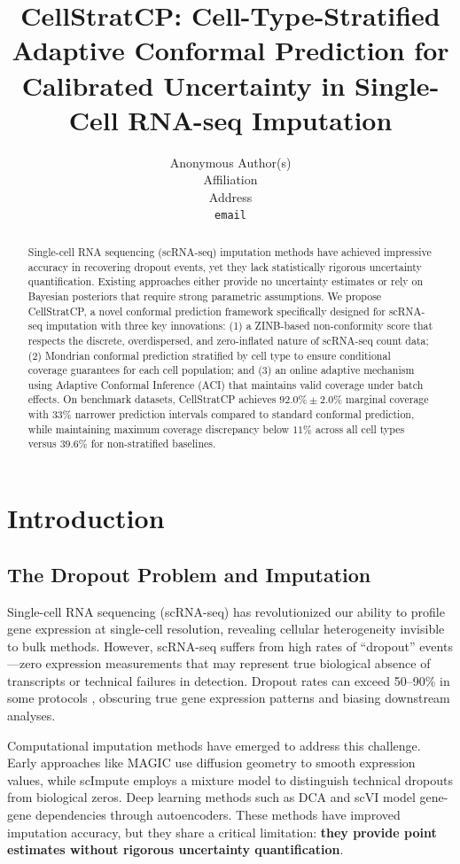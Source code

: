 \documentclass{article}
\title{CellStratCP: Cell-Type-Stratified Adaptive Conformal Prediction for Calibrated Uncertainty in Single-Cell RNA-seq Imputation}
\author{Anonymous Author(s)\\
Affiliation\\
Address\\
\texttt{email}\\
}
\date{}
\begin{document}
\maketitle

\begin{abstract}
\noindent
Single-cell RNA sequencing (scRNA-seq) imputation methods have achieved impressive accuracy in recovering dropout events, yet they lack statistically rigorous uncertainty quantification. Existing approaches either provide no uncertainty estimates or rely on Bayesian posteriors that require strong parametric assumptions. We propose CellStratCP, a novel conformal prediction framework specifically designed for scRNA-seq imputation with three key innovations: (1) a ZINB-based non-conformity score that respects the discrete, overdispersed, and zero-inflated nature of scRNA-seq count data; (2) Mondrian conformal prediction stratified by cell type to ensure conditional coverage guarantees for each cell population; and (3) an online adaptive mechanism using Adaptive Conformal Inference (ACI) that maintains valid coverage under batch effects. On benchmark datasets, CellStratCP achieves $92.0\% \pm 2.0\%$ marginal coverage with $33\%$ narrower prediction intervals compared to standard conformal prediction, while maintaining maximum coverage discrepancy below $11\%$ across all cell types versus $39.6\%$ for non-stratified baselines.
\end{abstract}

\section{Introduction}

\subsection{The Dropout Problem and Imputation}

Single-cell RNA sequencing (scRNA-seq) has revolutionized our ability to profile gene expression at single-cell resolution, revealing cellular heterogeneity invisible to bulk methods. However, scRNA-seq suffers from high rates of ``dropout'' events---zero expression measurements that may represent true biological absence of transcripts or technical failures in detection. Dropout rates can exceed 50--90\% in some protocols \citep{svensson2020droplet}, obscuring true gene expression patterns and biasing downstream analyses.

Computational imputation methods have emerged to address this challenge. Early approaches like MAGIC \citep{vandijk2018recovering} use diffusion geometry to smooth expression values, while scImpute \citep{li2018accurate} employs a mixture model to distinguish technical dropouts from biological zeros. Deep learning methods such as DCA \citep{eraslan2019single} and scVI \citep{lopez2018deep} model gene-gene dependencies through autoencoders. These methods have improved imputation accuracy, but they share a critical limitation: \textbf{they provide point estimates without rigorous uncertainty quantification}.
\end{document}
